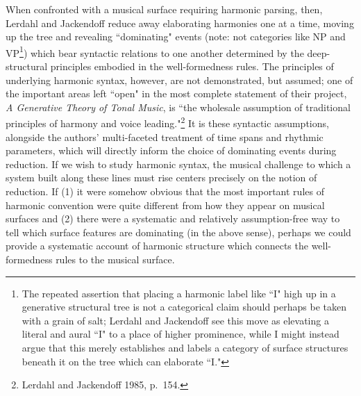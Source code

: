 When confronted with a musical surface requiring harmonic parsing, then, Lerdahl and Jackendoff reduce away elaborating harmonies one at a time, moving up the tree and revealing ``dominating" events (note: not categories like NP and VP\footnote{The repeated assertion that placing a harmonic label like ``I" high up in a generative structural tree is not a categorical claim should perhaps be taken with a grain of salt; Lerdahl and Jackendoff see this move as elevating a literal and aural ``I" to a place of higher prominence, while I might instead argue that this merely establishes and labels a category of surface structures beneath it on the tree which can elaborate ``I."}) which bear syntactic relations to one another determined by the deep-structural principles embodied in the well-formedness rules.  The principles of underlying harmonic syntax, however, are not demonstrated, but assumed; one of the important areas left ``open" in the most complete statement of their project, \emph{A Generative Theory of Tonal Music}, is ``the wholesale assumption of traditional principles of harmony and voice leading."\footnote{Lerdahl and Jackendoff 1985, p.\ 154.}  It is these syntactic assumptions, alongside the authors' multi-faceted treatment of time spans and rhythmic parameters, which will directly inform the choice of dominating events during reduction.  If we wish to study harmonic syntax, the musical challenge to which a system built along these lines must rise centers precisely on the notion of reduction.  If (1) it were somehow obvious that the most important rules of harmonic convention were quite different from how they appear on musical surfaces and (2) there were a systematic and relatively assumption-free way to tell which surface features are dominating (in the above sense), perhaps we could provide a systematic account of harmonic structure which connects the well-formedness rules to the musical surface.

